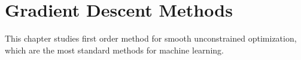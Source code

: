 
\chapter{Gradient Descent Methods}
\label{chap-conv-duality}


This chapter studies first order method for smooth unconstrained optimization, which are the most standard methods for machine learning. 









